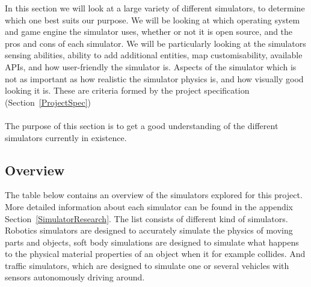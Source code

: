In this section we will look at a large variety of different simulators, to determine which one best suits our purpose. We will be looking at which operating system and game engine the simulator uses, whether or not it is open source, and the pros and cons of each simulator. We will be particularly looking at the simulators sensing abilities, ability to add additional entities, map customisability, available APIs, and how user-friendly the simulator is. Aspects of the simulator which is not as important as how realistic the simulator physics is, and how visually good looking it is. These are criteria formed by the project specification (Section~\ref{ProjectSpec})
\\~\\
The purpose of this section is to get a good understanding of the different simulators currently in existence.

\subsection{Overview}
The table below contains an overview of the simulators explored for this project. More detailed information about each simulator can be found in the appendix Section~\ref{SimulatorResearch}. The list consists of different kind of simulators. Robotics simulators are designed to accurately simulate the physics of moving parts and objects, soft body simulations are designed to simulate what happens to the physical material properties of an object when it for example collides. And traffic simulators, which are designed to simulate one or several vehicles with sensors autonomously driving around. 



